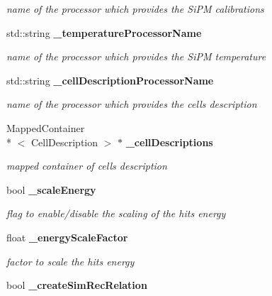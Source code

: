 \begin{DoxyCompactItemize}
\begin{DoxyCompactList}\small\item\em name of the processor which provides the Si\-P\-M calibrations \end{DoxyCompactList}\item 
std\-::string {\bf \-\_\-temperature\-Processor\-Name}\label{classCALICE_1_1SiPMCalibrateProcessor_ad57628decfdca245ff0bc4466e398d2f}

\begin{DoxyCompactList}\small\item\em name of the processor which provides the Si\-P\-M temperature \end{DoxyCompactList}\item 
std\-::string {\bf \-\_\-cell\-Description\-Processor\-Name}\label{classCALICE_1_1SiPMCalibrateProcessor_a7470eb03aa80ec18c2bcb3bff172411d}

\begin{DoxyCompactList}\small\item\em name of the processor which provides the cells description \end{DoxyCompactList}\item 
Mapped\-Container\\*
$<$ Cell\-Description $>$ $\ast$ {\bf \-\_\-cell\-Descriptions}\label{classCALICE_1_1SiPMCalibrateProcessor_a008a04e60e994e7f5a60e4752808d4cf}

\begin{DoxyCompactList}\small\item\em mapped container of cells description \end{DoxyCompactList}\item 
bool {\bf \-\_\-scale\-Energy}\label{classCALICE_1_1SiPMCalibrateProcessor_a2d1cc15e62943ab55fe09f85a035e0a8}

\begin{DoxyCompactList}\small\item\em flag to enable/disable the scaling of the hits energy \end{DoxyCompactList}\item 
float {\bf \-\_\-energy\-Scale\-Factor}\label{classCALICE_1_1SiPMCalibrateProcessor_a1bb566afa9919856a28d3e0496d67236}

\begin{DoxyCompactList}\small\item\em factor to scale the hits energy \end{DoxyCompactList}\item 
bool {\bf \-\_\-create\-Sim\-Rec\-Relation}\label{classCALICE_1_1SiPMCalibrateProcessor_a3901432aa67fe2cc8045eb1e33f77c18}


\end{DoxyCompactItemize}
